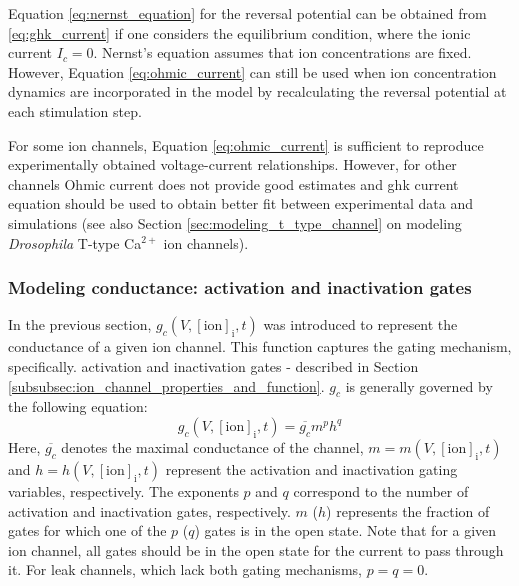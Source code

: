 \documentclass[../main.tex]{subfiles}
\begin{document}
Equation \ref{eq:nernst_equation} for the reversal potential can be obtained from \ref{eq:ghk_current} if one considers
the equilibrium condition, where the ionic current $I_c=0$. Nernst's equation assumes that ion concentrations
are fixed. However, Equation \ref{eq:ohmic_current} can still be used when ion concentration dynamics
are incorporated in the model by recalculating the reversal potential at each stimulation step.

For some ion channels, Equation \ref{eq:ohmic_current} is sufficient to reproduce experimentally obtained
voltage-current relationships. However, for other channels Ohmic current does not provide good
estimates and \gls{ghk} current equation should be used to obtain better fit between
experimental data and simulations \parencite{huguenardSimulationCurrentsInvolved1992} (see also Section \ref{sec:modeling_t_type_channel} on modeling \textit{Drosophila} T-type Ca$^{2+}$ ion channels).

\subsubsection{Modeling conductance: activation and inactivation gates} \label{subsubsec:modeling_conductance}

In the previous section, $g_c(V,[\text{ion}]_{\text{i}},t)$ was introduced to represent the conductance of a given ion channel. This function captures the gating mechanism, specifically. activation and inactivation gates - described in Section \ref{subsubsec:ion_channel_properties_and_function}. $g_c$ is generally governed by the following equation:
\begin{equation} \label{eq:conductance_wrt_gating_variables}
    g_c(V,[\text{ion}]_{\text{i}},t) = \overline{g_c} m^p h^q
\end{equation}
Here, $\overline{g_c}$ denotes the maximal conductance of the channel,
$m=m(V,[\text{ion}]_{\text{i}},t)$ and $h=h(V,[\text{ion}]_{\text{i}},t)$ represent the activation and inactivation gating variables, respectively. The exponents $p$ and $q$ correspond to the number of activation and inactivation gates, respectively. $m$ ($h$) represents the fraction of gates for which one of the $p$ ($q$) gates is in the open state. Note that for a given ion channel, all gates should be in the open state for the current to pass through it. For leak channels, which lack both gating mechanisms, $p=q=0$. 
\end{document}
